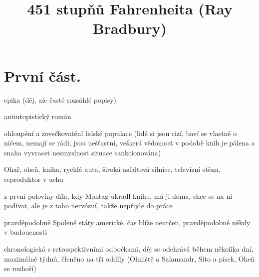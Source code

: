 \documentclass{article}
\title{\vspace{-2cm}451 stupňů Fahrenheita (Ray Bradbury)\vspace{-2cm}}
\date{}
\author{}
\begin{document}
\maketitle
\section{První část.}
\begin{description}
    \setlength\itemsep{0.15em}
    \item[druh:] epika (děj, ale časté rozsáhlé popisy)
    \item[žánr:] antiutopistický román
    \item[téma:] ohloupění a zovečkovatění lidské populace (lidé si jsou cizí, baví se vlastně o ničem, nemají se rádi, jsou nešťastní, veškerá vědomost v podobě knih je pálena a snaha vyvracet nesmyslnost situace sankcionována)
    \item[motivy:] Ohař, oheň, kniha, rychlá auta, široká asfaltová silnice, televizní stěna, reproduktor v uchu
    \item[zařazení výňatku do kontextu díla:] z první poloviny díla, kdy Montag ukradl knihu, má ji doma, chce se na ni podívat, ale je z toho nervózní, takže nepřijde do práce
    \item[časoprostor:] pravděpodobně Spolené státy americké, čas blíže neurčen, pravděpodobně někdy v budoucnosti
    \item[kompoziční výstavba:] chronologická s retrospektivními odbočkami, děj se odehrává během několika dní, maximálně týdnů, členěno na tři oddíly (Ohniště a Salamandr, Síto a písek, Oheň se rozhoří)
\end{description}
\end{document}
